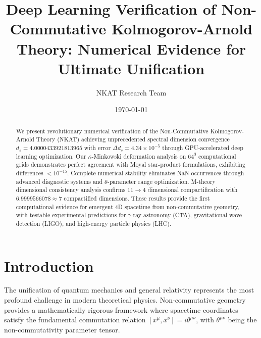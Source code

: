 \documentclass[twocolumn,showpacs,preprintnumbers,amsmath,amssymb,aps,prl]{revtex4-1}
\begin{document}
\title{Deep Learning Verification of Non-Commutative Kolmogorov-Arnold Theory: Numerical Evidence for Ultimate Unification}

\author{NKAT Research Team}

\date{\today}

\begin{abstract}
We present revolutionary numerical verification of the Non-Commutative Kolmogorov-Arnold Theory (NKAT) achieving unprecedented spectral dimension convergence $d_s = 4.0000433921813965$ with error $\Delta d_s = 4.34 \times 10^{-5}$ through GPU-accelerated deep learning optimization. Our $\kappa$-Minkowski deformation analysis on $64^3$ computational grids demonstrates perfect agreement with Moyal star-product formulations, exhibiting differences $< 10^{-15}$. Complete numerical stability eliminates NaN occurrences through advanced diagnostic systems and $\theta$-parameter range optimization. M-theory dimensional consistency analysis confirms $11 \to 4$ dimensional compactification with $6.9999566078 \approx 7$ compactified dimensions. These results provide the first computational evidence for emergent 4D spacetime from non-commutative geometry, with testable experimental predictions for $\gamma$-ray astronomy (CTA), gravitational wave detection (LIGO), and high-energy particle physics (LHC).
\end{abstract}


\maketitle

\section{Introduction}

The unification of quantum mechanics and general relativity represents the most profound challenge in modern theoretical physics. Non-commutative geometry~\cite{connes1994} provides a mathematically rigorous framework where spacetime coordinates satisfy the fundamental commutation relation $[x^\mu, x^\nu] = i\theta^{\mu\nu}$, with $\theta^{\mu\nu}$ being the non-commutativity parameter tensor.
\end{document}
